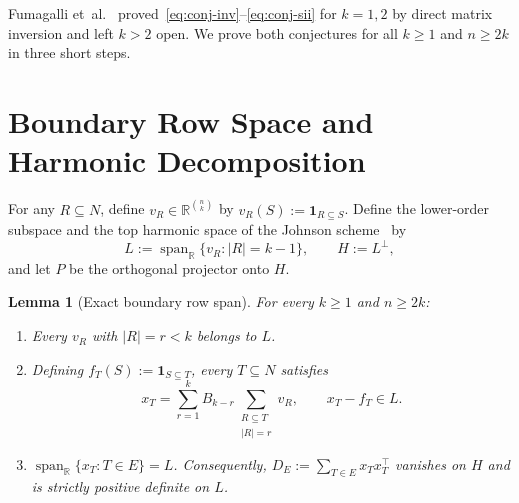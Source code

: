 \documentclass[11pt]{article}
\theoremstyle{plain}
\newtheorem{lemma}[theorem]{Lemma}
\theoremstyle{definition}
\theoremstyle{remark}
\DeclareMathOperator{\spn}{span}
\begin{document}
Fumagalli et~al.~\cite{Fumagalli2024} proved~\eqref{eq:conj-inv}--\eqref{eq:conj-sii} for $k = 1, 2$ by direct matrix inversion and left $k > 2$ open. We prove both conjectures for all $k \ge 1$ and $n \ge 2k$ in three short steps.

\section{Boundary Row Space and Harmonic Decomposition}

For any $R \subseteq N$, define $v_R \in \mathbb{R}^{\binom{n}{k}}$ by $v_R(S) := \mathbf{1}_{R \subseteq S}$. Define the lower-order subspace and the top harmonic space of the Johnson scheme~\cite{Gottlieb1966,Delsarte1973} by
\[
L := \spn_{\mathbb{R}}\{v_R : |R| = k - 1\}, \qquad H := L^\perp,
\]
and let $P$ be the orthogonal projector onto $H$.

\begin{lemma}[Exact boundary row span]\label{lem:boundary}
For every $k \ge 1$ and $n \ge 2k$:
\begin{enumerate}[label=\textup{(\arabic*)}]
\item Every $v_R$ with $|R| = r < k$ belongs to $L$.
\item Defining $f_T(S) := \mathbf{1}_{S \subseteq T}$, every $T \subseteq N$ satisfies
\begin{equation}\label{eq:xT-expand}
x_T = \sum_{r=1}^k B_{k-r} \sum_{\substack{R \subseteq T \\ |R| = r}} v_R,
\qquad x_T - f_T \in L.
\end{equation}
\item $\spn_{\mathbb{R}}\{x_T : T \in E\} = L$. Consequently, $D_E := \sum_{T \in E} x_T x_T^\top$ vanishes on $H$ and is strictly positive definite on $L$.
\end{enumerate}
\end{lemma}
\end{document}
